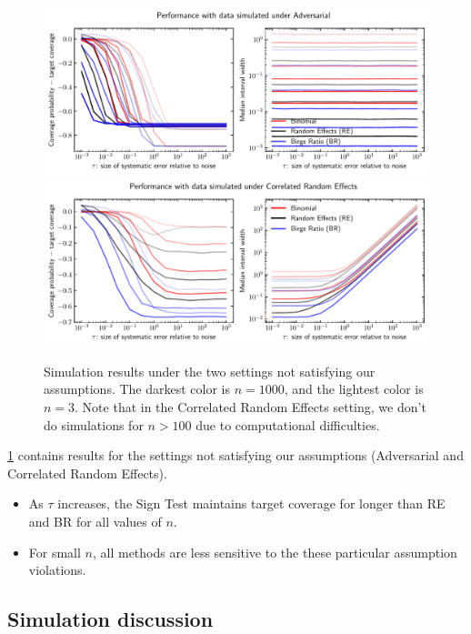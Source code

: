 \documentclass[letterpaper,12pt]{article}
\begin{document}
\begin{figure}[htbp]
\centering
\includegraphics[width=\textwidth]{figs/performance_adversarial.pdf}
\includegraphics[width=\textwidth]{figs/performance_random_effects_corr.pdf}
\label{fig:sim-results2}
\caption{Simulation results under the two settings not satisfying our assumptions. The darkest color is $n=1000$, and the lightest color is $n=3$. Note that in the Correlated Random Effects setting, we don't do simulations for $n>100$ due to computational difficulties.}
\end{figure}



\ref{fig:sim-results2} contains results for the settings not satisfying our assumptions (Adversarial and Correlated Random Effects).

\begin{itemize}
\item
  As $\tau$ increases, the Sign Test maintains target coverage for longer than RE and BR for all values of $n$.
\item
  For small $n$, all methods are less sensitive to the these particular assumption violations.
\end{itemize}

\subsection{Simulation discussion}\label{simulation-discussion}
\end{document}
